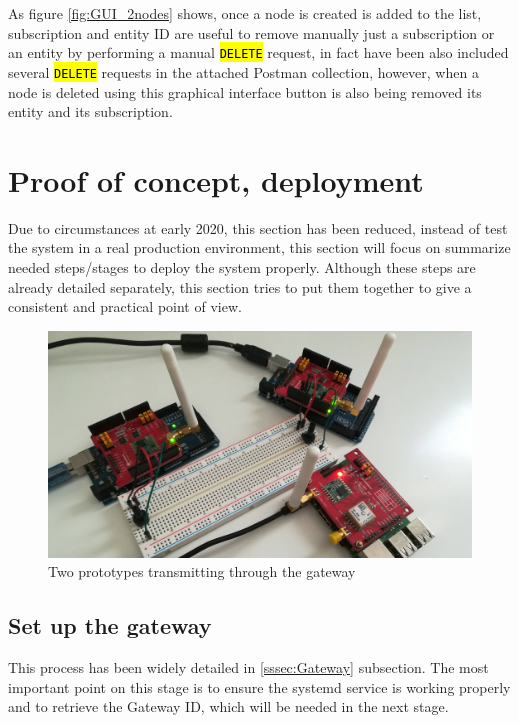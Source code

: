 \documentclass[11pt,a4paper,dvipsnames,twoside]{article}
\newcommand{\cmd}[1] {\hl{\texttt{#1}}}
\begin{document}
As figure \ref{fig:GUI_2nodes} shows, once a node is created is added to the list, subscription and entity ID are useful to remove manually just a subscription or an entity by performing a manual \cmd{DELETE} request, in fact have been also included several \cmd{DELETE} requests in the attached Postman collection, however, when a node is deleted using this graphical interface button is also being removed its entity and its subscription.

\clearpage{\pagestyle{empty}\cleardoublepage}\thispagestyle{plain}  %
\section{Proof of concept, deployment}
Due to circumstances at early 2020, this section has been reduced, instead of test the system in a real production environment, this section will focus on summarize needed steps/stages to deploy the system properly. Although these steps are already detailed separately, this section tries to put them together to give a consistent and practical point of view.

\begin{figure}[ht]
  \centering
  \includegraphics[width=.9\textwidth]{../pictures/2prototypes_1gateway.jpg}  
  \caption{Two prototypes transmitting through the gateway}
  \label{fig:2nodes_gateway}
\end{figure}

\subsection{Set up the gateway}
This process has been widely detailed in \ref{sssec:Gateway} subsection. The most important point on this stage is to ensure the systemd service is working properly and to retrieve the Gateway ID, which will be needed in the next stage.
\end{document}
